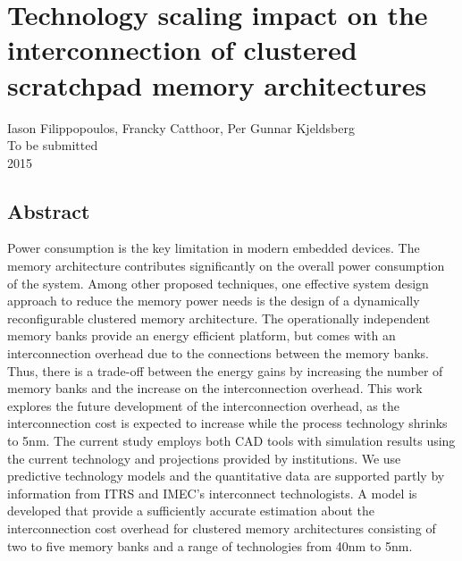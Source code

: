 
%


\chapter{Technology scaling impact on the interconnection of clustered scratchpad memory architectures}

\begin{center}
Iason Filippopoulos, Francky Catthoor, Per Gunnar Kjeldsberg
\\
To be submitted
\\
2015
\end{center}
\afterpage{\null\newpage}
\newpage

\vspace*{\fill}
\section*{\hspace*{\fill} Abstract \hspace*{\fill}}
Power consumption is the key limitation in modern embedded devices.
The memory architecture contributes significantly on the overall power consumption of the system.
Among other proposed techniques, one effective system design approach to reduce the memory power needs is the design of a dynamically reconfigurable clustered memory architecture.
The operationally independent memory banks provide an energy efficient platform, but comes with an interconnection overhead due to the connections between the memory banks. 
Thus, there is a trade-off between the energy gains by increasing the number of memory banks and the increase on the interconnection overhead.
This work explores the future development of the interconnection overhead, as the interconnection cost is expected to increase while the process technology shrinks to 5nm.
The current study employs both CAD tools with simulation results using the current technology and projections provided by institutions.
We use predictive technology models and the quantitative data are supported partly by information
from ITRS and IMEC's interconnect technologists.
A model is developed that provide a sufficiently accurate estimation about the interconnection cost overhead for clustered memory architectures consisting of two to five memory banks and a range of technologies from 40nm to 5nm.  
\vspace*{\fill}
\afterpage{\null\newpage}
\newpage

